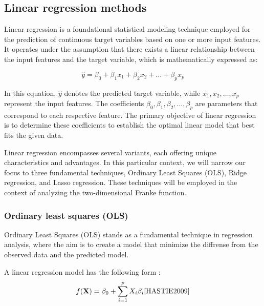 \thispagestyle{plain}

\subsection{Linear regression methods}

\noindent Linear regression is a foundational statistical modeling technique employed for the prediction of continuous target variables
based on one or more input features. It operates under the assumption that there exists a linear relationship between the input features
and the target variable, which is mathematically expressed as:

\begin{equation} 
\hat{y} = \beta_0 + \beta_1 x_1 + \beta_2 x_2 + \ldots + \beta_p x_p \label{Linear_regression} 
\end{equation}

In this equation, $\hat{y}$ denotes the predicted target variable, while $x_1, x_2, \ldots, x_p$ represent the input features. The 
coefficients $\beta_0, \beta_1, \beta_2, \ldots, \beta_p$ are parameters that correspond to each respective feature. The primary objective 
of linear regression is to determine these coefficients to establish the optimal linear model that best fits the given data.

Linear regression encompasses several variants, each offering unique characteristics and advantages. In this particular context, 
we will narrow our focus to three fundamental techniques, Ordinary Least Squares (OLS), Ridge regression, and Lasso regression. These 
techniques will be employed in the context of analyzing the two-dimensional Franke function. 


\subsubsection{Ordinary least squares (OLS)}
\noindent Ordinary Least Squares (OLS) stands as a fundamental technique in regression
analysis, where the aim is to create a model that minimize the diffrense from
the observed data and the predicted model. 


A linear regression model has the following form :
\begin{align}
    f(\textbf{X}) = \beta_0 + \sum^{p}_{i=1} X_i \beta_i \label{linear model} \text{\cite{HASTIE2009}} %
\end{align}

